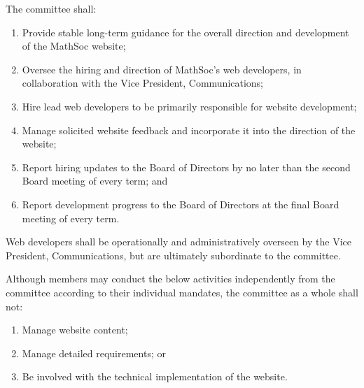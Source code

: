 The committee shall:

\begin{enumerate}
  \item Provide stable long-term guidance for the overall direction and development of the MathSoc website;
  \item Oversee the hiring and direction of MathSoc’s web developers, in collaboration with the Vice President, Communications;
  \item Hire lead web developers to be primarily responsible for website development;
  \item Manage solicited website feedback and incorporate it into the direction of the website;
  \item Report hiring updates to the Board of Directors by no later than the second Board meeting of every term; and
  \item Report development progress to the Board of Directors at the final Board meeting of every term.
\end{enumerate}

Web developers shall be operationally and administratively overseen by the Vice President, Communications, but are ultimately subordinate to the committee.

Although members may conduct the below activities independently from the committee according to their individual mandates, the committee as a whole shall not:
\begin{enumerate}
  \item Manage website content;
  \item Manage detailed requirements; or
  \item Be involved with the technical implementation of the website.
\end{enumerate}

